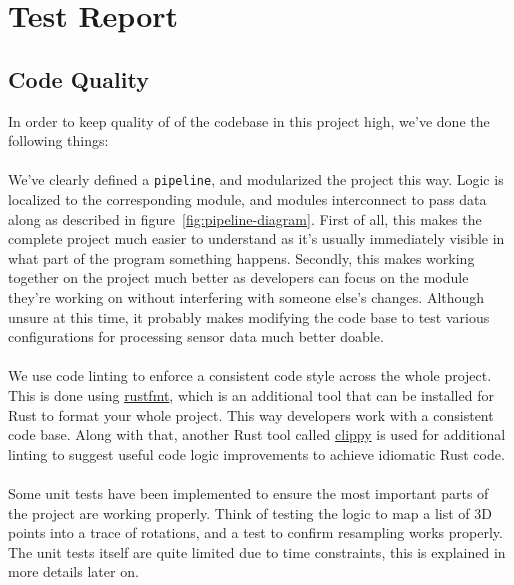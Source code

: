 \documentclass{standalone}
\begin{document}
  \section{Test Report}
  \subsection{Code Quality}
  In order to keep quality of of the codebase in this project high, we've done
  the following things:

  \paragraph{}
  We've clearly defined a \verb_pipeline_, and modularized the project this way.
  Logic is localized to the corresponding module, and modules interconnect to
  pass data along as described in figure~\ref{fig:pipeline-diagram}.
  First of all, this makes the complete project much easier to
  understand as it's usually immediately visible in what part of the program
  something happens. Secondly, this makes working together on the project much
  better as developers can focus on the module they're working on without
  interfering with someone else's changes. Although unsure at this time,
  it probably makes modifying the code base to test various configurations for
  processing sensor data much better doable.

  \paragraph{}
  We use code linting to enforce a consistent code style across the whole
  project. This is done using
  \href{https://github.com/rust-lang-nursery/rustfmt}{rustfmt},
  which is an additional tool that can be installed for Rust to format your
  whole project. This way developers work with a consistent code base. Along
  with that, another Rust tool called
  \href{https://github.com/rust-lang-nursery/rust-clippy}{clippy}
  is used for additional linting to suggest useful code logic improvements to
  achieve idiomatic Rust code.

  \paragraph{}
  Some unit tests have been implemented to ensure the most important parts of
  the project are working properly. Think of testing the logic to map a list of
  3D points into a trace of rotations, and a test to confirm resampling works
  properly. The unit tests itself are quite limited due to time constraints,
  this is explained in more details later on.
\end{document}
